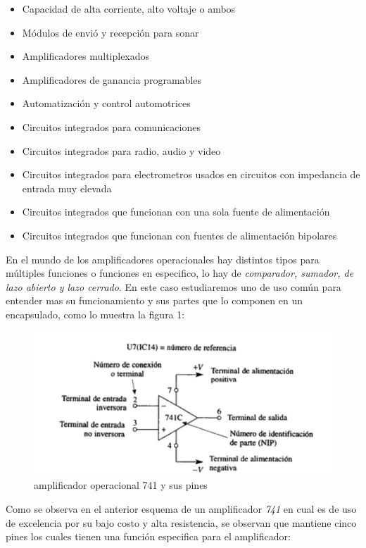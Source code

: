 \documentclass[11pt,a4paper]{article}
\begin{document}
\begin{itemize}
\item Capacidad de alta corriente, alto voltaje o ambos
\item Módulos de envió y recepción para sonar
\item Amplificadores multiplexados 
\item Amplificadores de ganancia programables
\item Automatización y control automotrices
\item Circuitos integrados para comunicaciones
\item Circuitos integrados para radio, audio y video
\item Circuitos integrados para electrometros usados en circuitos con impedancia de entrada muy elevada
\item Circuitos integrados que funcionan con una sola fuente de alimentación
\item Circuitos integrados que funcionan con fuentes de alimentación bipolares
\end{itemize}

En el mundo de los amplificadores operacionales hay distintos tipos para múltiples funciones o funciones en especifico, lo hay de \emph{comparador, sumador, de lazo abierto y lazo cerrado}. En este caso estudiaremos uno de uso común para entender mas su funcionamiento y sus partes que lo componen en un encapsulado, como lo muestra la figura 1:

\begin{figure}[h]
\begin{center}
\includegraphics[scale=0.8]{1.png}
\caption{amplificador operacional 741 y sus pines}
\end{center}
\end{figure}

\newpage

Como se observa en el anterior esquema de un amplificador \emph{741} en cual es de uso de excelencia por su bajo costo y alta resistencia, se observan que mantiene cinco pines los cuales tienen una función especifica para el amplificador:
\end{document}
